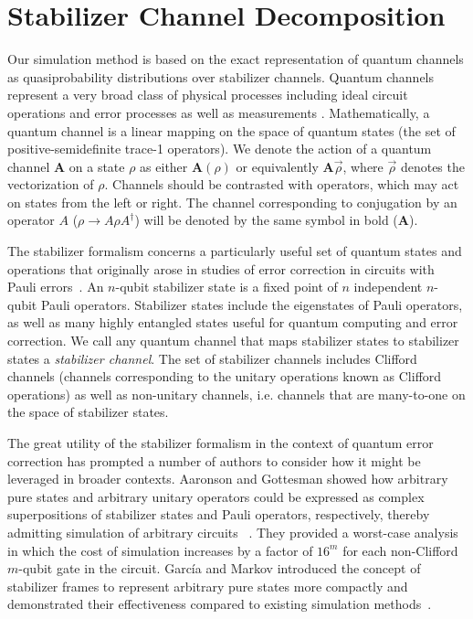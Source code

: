 \documentclass[twocolumn,pra]{revtex4}
\begin{document}
\section{Stabilizer Channel Decomposition}
\label{sec:rep}
Our simulation method is based on the exact representation of quantum channels as quasiprobability distributions over stabilizer channels.  Quantum channels represent a very broad class of physical processes including ideal circuit operations and error processes as well as measurements \cite{nielsen2010quantum}.  Mathematically, a quantum channel is a linear mapping on the space of quantum states (the set of positive-semidefinite trace-1 operators).  We denote the action of a quantum channel $\mathbf{A}$ on a state $\rho$ as either $\mathbf{A}(\rho)$ or equivalently $\mathbf{A}\vec{\rho}$, where $\vec{\rho}$ denotes the vectorization of $\rho$. Channels should be contrasted with operators, which may act on states from the left or right. The channel corresponding to conjugation by an operator $A$ ($\rho \to A \rho A^\dagger$) will be denoted by the same symbol in bold ($\mathbf{A}$).
\par
The stabilizer formalism concerns a particularly useful set of quantum states and operations that originally arose in studies of error correction in circuits with Pauli errors~\cite{gottesman1998heisenberg}. 
An $n$-qubit stabilizer state is a fixed point of $n$ independent $n$-qubit Pauli operators. Stabilizer states include the eigenstates of Pauli operators, as well as many highly entangled states useful for quantum computing and error correction.
We call any quantum channel that maps stabilizer states to stabilizer states a \emph{stabilizer channel}. The set of stabilizer channels includes Clifford channels (channels corresponding to the unitary operations known as Clifford operations) as well as non-unitary channels, i.e. channels that are many-to-one on the space of stabilizer states. 
 \par
The great utility of the stabilizer formalism in the context of quantum error correction has prompted a number of authors to consider how it might be leveraged in broader contexts. Aaronson and Gottesman showed how arbitrary pure states and arbitrary unitary operators could be expressed as complex superpositions of stabilizer states and Pauli operators, respectively, thereby admitting simulation of arbitrary circuits ~\cite{Aaronson2004}. They provided a worst-case analysis in which the cost of simulation increases by a factor of $16^m$ for each non-Clifford $m$-qubit gate in the circuit. Garc\'ia and Markov introduced the concept of stabilizer frames to represent arbitrary pure states more compactly and demonstrated their effectiveness compared to existing simulation methods~\cite{garcia2015simulation}.
\end{document}
